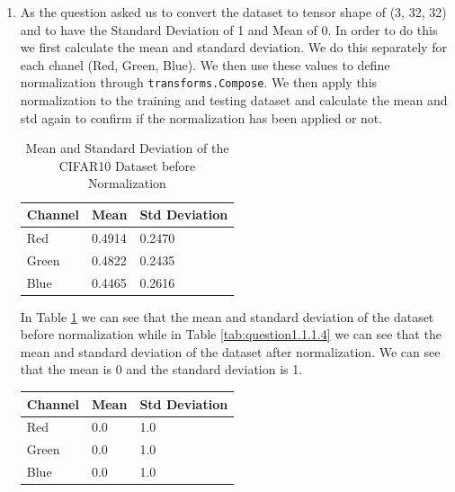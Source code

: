 \documentclass[a4paper]{article}
\newcommand{\codeword}[1]{\texttt{\textcolor{code}{#1}}}
\begin{document}
\begin{enumerate}
\begin{enumerate}
	      \end{enumerate}
	\item As the question asked us to convert the dataset to tensor shape of (3, 32, 32) and to have the Standard Deviation of 1 and Mean of 0. In order to do this we first calculate the mean and standard deviation. We do this separately for each chanel (Red, Green, Blue). We then use these values to define normalization through \codeword{transforms.Compose}. We then apply this normalization to the training and testing dataset and calculate the mean and std again to confirm if the normalization has been applied or not.

	      \begin{table}[H]
		      \centering
		      \begin{tabular}{|l|l|l|}
			      \hline
			      \textbf{Channel} & \textbf{Mean} & \textbf{Std Deviation} \\
			      \hline
			      Red              & 0.4914        & 0.2470                 \\
			      Green            & 0.4822        & 0.2435                 \\
			      Blue             & 0.4465        & 0.2616                 \\

			      \hline
		      \end{tabular}
		      \caption{Mean and Standard Deviation of the CIFAR10 Dataset before Normalization}
		      \label{tab:question1.4}
	      \end{table}

	      In Table \ref{tab:question1.4} we can see that the mean and standard deviation of the dataset before normalization while in Table \ref{tab:question1.1.1.4} we can see that the mean and standard deviation of the dataset after normalization. We can see that the mean is 0 and the standard deviation is 1.

	      \begin{table}[H]
		      \centering
		      \begin{tabular}{|l|l|l|}
			      \hline
			      \textbf{Channel} & \textbf{Mean} & \textbf{Std Deviation} \\
			      \hline
			      Red              & 0.0           & 1.0                    \\
			      Green            & 0.0           & 1.0                    \\
			      Blue             & 0.0           & 1.0                    \\


\end{tabular}
\end{table}
\end{enumerate}
\end{document}
